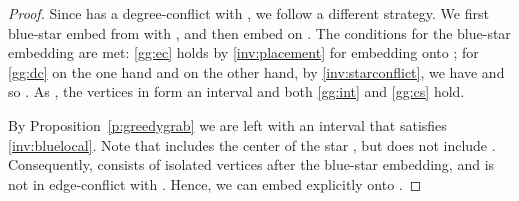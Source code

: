 \documentclass[11pt,a4paper,colorlinks=true,urlcolor=blue,citecolor=red]{article}
\theoremstyle{plain}
\begin{document}
\begin{proof}
Since  has a degree-conflict with , we follow a
different strategy. We first blue-star embed  from  with
, and then embed  on
. The conditions for the blue-star embedding are met:
\ref{gg:ec} holds by \ref{inv:placement} for embedding  onto ;
for \ref{gg:dc} on the one hand
 and on the
other hand, by \ref{inv:starconflict}, we have 
and so . As , the vertices
in  form an interval and both \ref{gg:int}
and \ref{gg:cs} hold.

By Proposition~\ref{p:greedygrab} we are left with an interval
 that satisfies \ref{inv:bluelocal}. Note that 
includes the center  of the star , but does not include
. Consequently,  consists of isolated vertices after the
blue-star embedding, and  is not in edge-conflict with . Hence, we
can embed  explicitly onto .
\end{proof}
\end{document}
